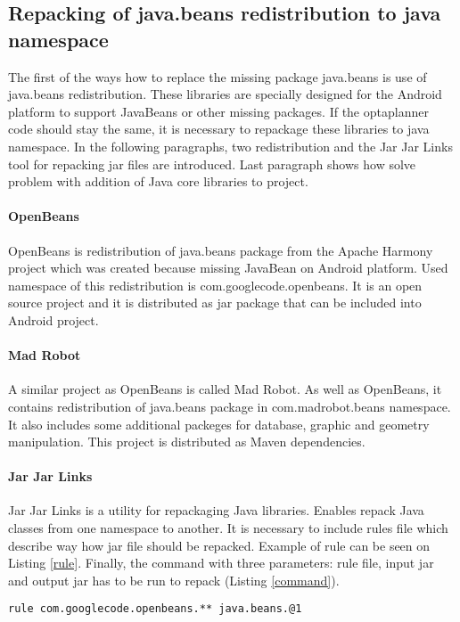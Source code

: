 \subsection{Repacking of java.beans redistribution to java namespace}
The first of the ways how to replace the missing package java.beans is use of java.beans redistribution. These libraries are specially designed for the Android platform to support JavaBeans or other missing packages. If the optaplanner code should stay the same, it is necessary to repackage these libraries to java namespace. In the following paragraphs, two redistribution and the Jar Jar Links tool for repacking jar files are introduced. Last paragraph shows how solve problem with addition of Java core libraries to project. 

\paragraph{OpenBeans}
OpenBeans is redistribution of java.beans package from the Apache Harmony project which was created because missing JavaBean on Android platform. Used namespace of this redistribution is com.googlecode.openbeans. It is an open source project and it is distributed as jar package that can be included into Android project. 

\paragraph{Mad Robot}
A similar project as OpenBeans is called Mad Robot. As well as OpenBeans, it contains redistribution of java.beans package in com.madrobot.beans namespace. It also includes some additional packeges for database, graphic and geometry manipulation. This project is distributed as Maven dependencies.

\paragraph{Jar Jar Links}
Jar Jar Links is a utility for repackaging Java libraries. Enables repack Java classes from one namespace to another. It is necessary to include rules file which describe way how jar file should be repacked. Example of rule can be seen on Listing \ref{rule}. Finally, the command with three parameters: rule file, input jar and output jar has to be run to repack (Listing \ref{command}). 
\\
\begin{lstlisting}[captionpos={b},caption={Jar Jar Links rule for repacking OpenBeans to java.beans namespace},frame={lines},label={rule},basicstyle=\footnotesize]
rule com.googlecode.openbeans.** java.beans.@1
\end{lstlisting}


